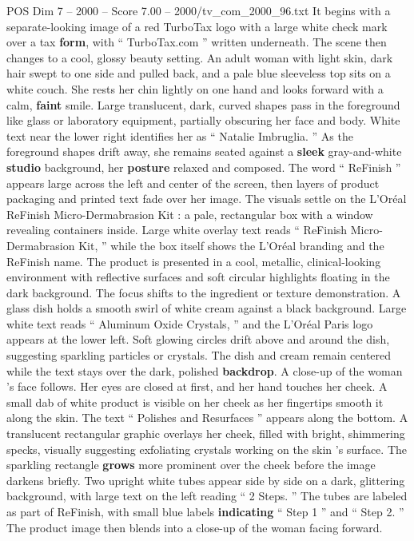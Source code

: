 \begin{textsample}{POS Dim 7 – 2000 – Score 7.00 – 2000/tv\_com\_2000\_96.txt}  \label{ex:f7_pos_075}
It begins with a separate-looking image of a red TurboTax logo with a large white check mark over a tax \textbf{form}, with “ TurboTax.com ” written underneath.
The scene then changes to a cool, glossy beauty setting.
An adult woman with light skin, dark hair swept to one side and pulled back, and a pale blue sleeveless top sits on a white couch.
She rests her chin lightly on one hand and looks forward with a calm, \textbf{faint} smile.
Large translucent, dark, curved shapes pass in the foreground like glass or laboratory equipment, partially obscuring her face and body.
White text near the lower right identifies her as “ Natalie Imbruglia. ” As the foreground shapes drift away, she remains seated against a \textbf{sleek} gray-and-white \textbf{studio} background, her \textbf{posture} relaxed and composed.
The word “ ReFinish ” appears large across the left and center of the screen, then layers of product packaging and printed text fade over her image.
The visuals settle on the L’Oréal ReFinish Micro-Dermabrasion Kit : a pale, rectangular box with a window revealing containers inside.
Large white overlay text reads “ ReFinish Micro-Dermabrasion Kit, ” while the box itself shows the L’Oréal branding and the ReFinish name.
The product is presented in a cool, metallic, clinical-looking environment with reflective surfaces and soft circular highlights floating in the dark background.
The focus shifts to the ingredient or texture demonstration.
A glass dish holds a smooth swirl of white cream against a black background.
Large white text reads “ Aluminum Oxide Crystals, ” and the L’Oréal Paris logo appears at the lower left.
Soft glowing circles drift above and around the dish, suggesting sparkling particles or crystals.
The dish and cream remain centered while the text stays over the dark, polished \textbf{backdrop}.
A close-up of the woman ’s face follows.
Her eyes are closed at first, and her hand touches her cheek.
A small dab of white product is visible on her cheek as her fingertips smooth it along the skin.
The text “ Polishes and Resurfaces ” appears along the bottom.
A translucent rectangular graphic overlays her cheek, filled with bright, shimmering specks, visually suggesting exfoliating crystals working on the skin ’s surface.
The sparkling rectangle \textbf{grows} more prominent over the cheek before the image darkens briefly.
Two upright white tubes appear side by side on a dark, glittering background, with large text on the left reading “ 2 Steps. ” The tubes are labeled as part of ReFinish, with small blue labels \textbf{indicating} “ Step 1 ” and “ Step 2. ” The product image then blends into a close-up of the woman facing forward.

\end{textsample}
